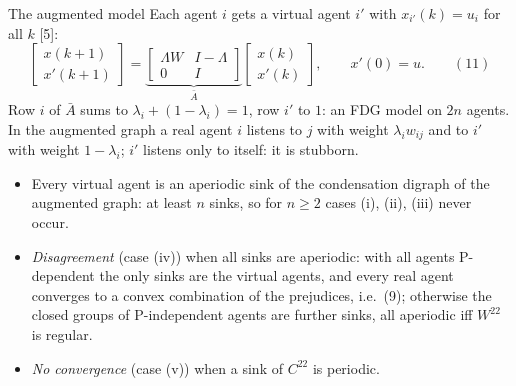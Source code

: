 \begin{frame}[label=bk-augmented]{The augmented model}
  \small
  Each agent $i$ gets a virtual agent $i'$ with $x_{i'}(k) = u_i$ for all $k$ [5]:
  \[
    \begin{bmatrix} x(k+1) \\ x'(k+1) \end{bmatrix}
    = \underbrace{\begin{bmatrix} \Lambda W & I - \Lambda \\ 0 & I \end{bmatrix}}_{\bar A}
      \begin{bmatrix} x(k) \\ x'(k) \end{bmatrix},
    \qquad x'(0) = u . \qquad (11)
  \]
  Row $i$ of $\bar A$ sums to $\lambda_i + (1 - \lambda_i) = 1$, row $i'$ to $1$: an FDG
  model on $2n$ agents. In the augmented graph a real agent $i$ listens to $j$ with weight
  $\lambda_i w_{ij}$ and to $i'$ with weight $1 - \lambda_i$; $i'$ listens only to itself:
  it is stubborn.
  \begin{itemize}
    \item Every virtual agent is an aperiodic sink of the condensation digraph of the
          augmented graph: at least $n$ sinks, so for $n \geq 2$ cases (i), (ii), (iii)
          never occur.
    \item \emph{Disagreement} (case (iv)) when all sinks are aperiodic: with all agents
          P-dependent the only sinks are the virtual agents, and every real agent converges
          to a convex combination of the prejudices, i.e.\ (9); otherwise the closed groups
          of P-independent agents are further sinks, all aperiodic iff $W^{22}$ is regular.
    \item \emph{No convergence} (case (v)) when a sink of $C^{22}$ is periodic.
  \end{itemize}
\end{frame}

